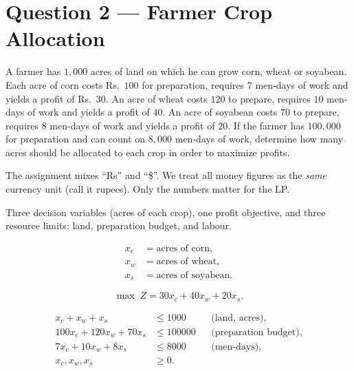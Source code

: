 \section{Question 2 --- Farmer Crop Allocation}

\begin{questionbox}
A farmer has \(1{,}000\) acres of land on which he can grow corn, wheat or soyabean.
Each acre of corn costs Rs.\ \(100\) for preparation, requires \(7\) men-days of work and
yields a profit of Rs.\ \(30\). An acre of wheat costs \(120\) to prepare, requires \(10\)
men-days of work and yields a profit of \(40\). An acre of soyabean costs \(70\) to prepare,
requires \(8\) men-days of work and yields a profit of \(20\). If the farmer has \(100{,}000\)
for preparation and can count on \(8{,}000\) men-days of work, determine how many acres
should be allocated to each crop in order to maximize profits.
\end{questionbox}

\begin{warningbox}[title={Units in the question text}]
The assignment mixes ``Rs'' and ``\$''. We treat all money figures as the \emph{same}
currency unit (call it rupees). Only the numbers matter for the LP.
\end{warningbox}


\begin{ideabox}
Three decision variables (acres of each crop), one profit objective, and three
resource limits: land, preparation budget, and labour.
\end{ideabox}

\begin{align*}
  x_c &= \text{acres of corn},\\
  x_w &= \text{acres of wheat},\\
  x_s &= \text{acres of soyabean}.
\end{align*}

\[
  \max\; Z = 30x_c + 40x_w + 20x_s.
\]

\begin{align*}
  x_c + x_w + x_s &\le 1000 && \text{(land, acres)},\\
  100x_c + 120x_w + 70x_s &\le 100000 && \text{(preparation budget)},\\
  7x_c + 10x_w + 8x_s &\le 8000 && \text{(men-days)},\\
  x_c,x_w,x_s &\ge 0.
\end{align*}

